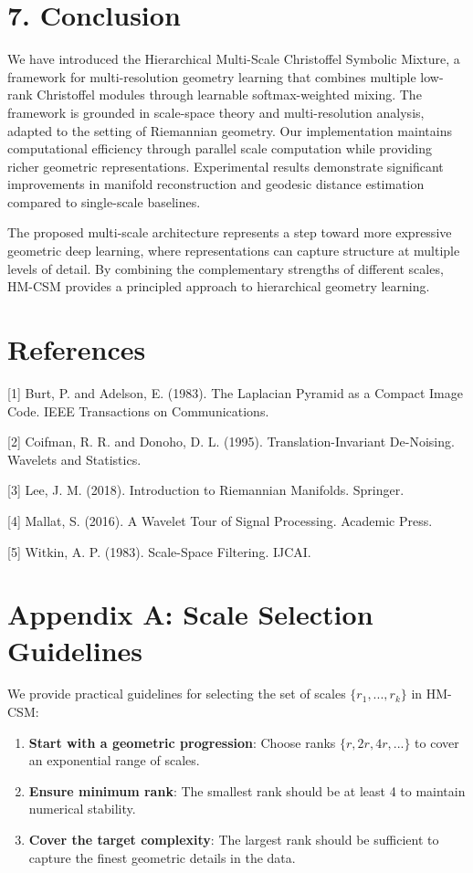 \documentclass[12pt]{article}
\begin{document}
\section{7. Conclusion}

We have introduced the Hierarchical Multi-Scale Christoffel Symbolic Mixture, a framework for multi-resolution geometry learning that combines multiple low-rank Christoffel modules through learnable softmax-weighted mixing. The framework is grounded in scale-space theory and multi-resolution analysis, adapted to the setting of Riemannian geometry. Our implementation maintains computational efficiency through parallel scale computation while providing richer geometric representations. Experimental results demonstrate significant improvements in manifold reconstruction and geodesic distance estimation compared to single-scale baselines.

The proposed multi-scale architecture represents a step toward more expressive geometric deep learning, where representations can capture structure at multiple levels of detail. By combining the complementary strengths of different scales, HM-CSM provides a principled approach to hierarchical geometry learning.

\section*{References}

[1] Burt, P. and Adelson, E. (1983). The Laplacian Pyramid as a Compact Image Code. IEEE Transactions on Communications.

[2] Coifman, R. R. and Donoho, D. L. (1995). Translation-Invariant De-Noising. Wavelets and Statistics.

[3] Lee, J. M. (2018). Introduction to Riemannian Manifolds. Springer.

[4] Mallat, S. (2016). A Wavelet Tour of Signal Processing. Academic Press.

[5] Witkin, A. P. (1983). Scale-Space Filtering. IJCAI.

\appendix

\section*{Appendix A: Scale Selection Guidelines}

We provide practical guidelines for selecting the set of scales $\{r_1, ..., r_k\}$ in HM-CSM:

\begin{enumerate}
\item \textbf{Start with a geometric progression}: Choose ranks $\{r, 2r, 4r, ...\}$ to cover an exponential range of scales.
\item \textbf{Ensure minimum rank}: The smallest rank should be at least 4 to maintain numerical stability.
\item \textbf{Cover the target complexity}: The largest rank should be sufficient to capture the finest geometric details in the data.
\end{enumerate}
\end{document}
